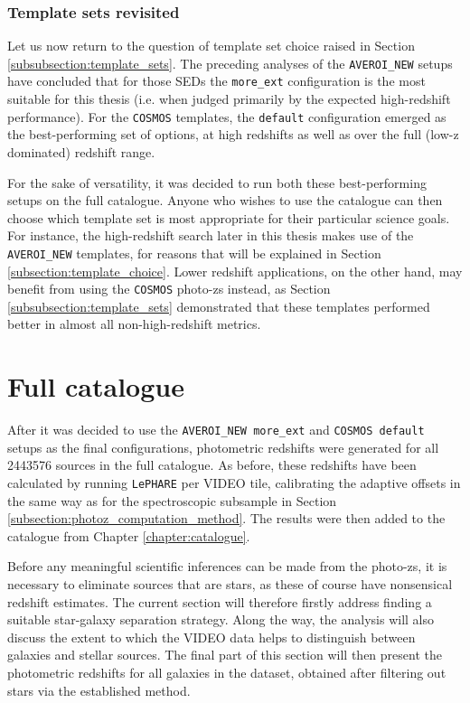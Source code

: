 \subsubsection{Template sets revisited}\label{subsubsection:templates_revisited}
Let us now return to the question of template set choice raised in Section \ref{subsubsection:template_sets}. The preceding analyses of the \texttt{AVEROI\_NEW} setups have concluded that for those SEDs the \texttt{more\_ext} configuration is the most suitable for this thesis (i.e. when judged primarily by the expected high-redshift performance). For the \texttt{COSMOS} templates, the \texttt{default} configuration emerged as the best-performing set of options, at high redshifts as well as over the full (low-z dominated) redshift range. \par

For the sake of versatility, it was decided to run both these best-performing setups on the full \DESVIDEO catalogue. Anyone who wishes to use the catalogue can then choose which template set is most appropriate for their particular science goals. For instance, the high-redshift search later in this thesis makes use of the \texttt{AVEROI\_NEW} templates, for reasons that will be explained in Section \ref{subsection:template_choice}. Lower redshift applications, on the other hand, may benefit from using the \texttt{COSMOS} photo-zs instead, as Section \ref{subsubsection:template_sets} demonstrated that these templates performed better in almost all non-high-redshift metrics.\par




\section{Full \DESVIDEO catalogue}\label{section:full_catalogue}
After it was decided to use the \texttt{AVEROI\_NEW more\_ext} and \texttt{COSMOS default} setups as the final configurations, photometric redshifts were generated for all \num{2 443 576} sources in the full \DESVIDEO catalogue. As before, these redshifts have been calculated by running \texttt{LePHARE} per VIDEO tile, calibrating the adaptive offsets in the same way as for the spectroscopic subsample in Section \ref{subsection:photoz_computation_method}. The results were then added to the \DESVIDEO catalogue from Chapter \ref{chapter:catalogue}. \par

Before any meaningful scientific inferences can be made from the photo-zs, it is necessary to eliminate sources that are stars, as these of course have nonsensical redshift estimates. The current section will therefore firstly address finding a suitable star-galaxy separation strategy. Along the way, the analysis will also discuss the extent to which the VIDEO data helps to distinguish between galaxies and stellar sources. The final part of this section will then present the photometric redshifts for all galaxies in the \DESVIDEO dataset, obtained after filtering out stars via the established method. \par




